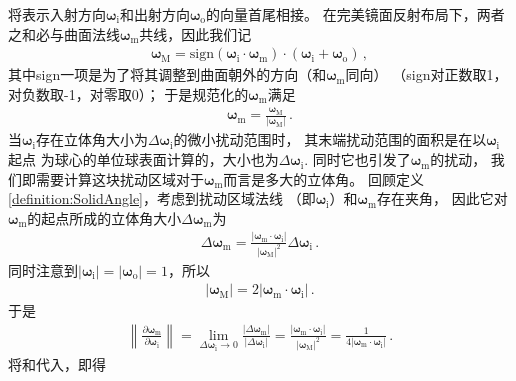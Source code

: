 将表示入射方向${\bm\omega}_{\mathrm{i}}$和出射方向${\bm\omega}_{\mathrm{o}}$的向量首尾相接。
在完美镜面反射布局下，两者之和必与曲面法线${\bm\omega}_{\mathrm{m}}$共线，因此我们记
\begin{align}
    {\bm\omega}_{\mathrm{M}}=\mathrm{sign}({\bm\omega}_{\mathrm{i}}\cdot{\bm\omega}_{\mathrm{m}})
    \cdot({\bm\omega}_{\mathrm{i}}+{\bm\omega}_{\mathrm{o}})\, ,
\end{align}
其中sign一项是为了将其调整到曲面朝外的方向（和${\bm\omega}_{\mathrm{m}}$同向）
（sign对正数取1，对负数取-1，对零取0）；
于是规范化的${\bm\omega}_{\mathrm{m}}$满足
\begin{align}
    {\bm\omega}_{\mathrm{m}}=\frac{{\bm\omega}_{\mathrm{M}}}{|{\bm\omega}_{\mathrm{M}}|}\, .
\end{align}
当${\bm\omega}_{\mathrm{i}}$存在立体角大小为$\Delta{\bm\omega}_{\mathrm{i}}$的微小扰动范围时，
其末端扰动范围的面积是在以${\bm\omega}_{\mathrm{i}}$起点
为球心的单位球表面计算的，大小也为$\Delta{\bm\omega}_{\mathrm{i}}$.
同时它也引发了${\bm\omega}_{\mathrm{m}}$的扰动，
我们即需要计算这块扰动区域对于${\bm\omega}_{\mathrm{m}}$而言是多大的立体角。
回顾定义\ref{definition:SolidAngle}，考虑到扰动区域法线
（即${\bm\omega}_{\mathrm{i}}$）和${\bm\omega}_{\mathrm{m}}$存在夹角，
因此它对${\bm\omega}_{\mathrm{m}}$的起点所成的立体角大小$\Delta{\bm\omega}_{\mathrm{m}}$为
\begin{align}
    \Delta{\bm\omega}_{\mathrm{m}}=\frac{|{\bm\omega}_{\mathrm{m}}\cdot{\bm\omega}_{\mathrm{i}}|}
    {|{\bm\omega}_{\mathrm{M}}|^2}\Delta{\bm\omega}_{\mathrm{i}}\, .
\end{align}
同时注意到$|{\bm\omega}_{\mathrm{i}}|=|{\bm\omega}_{\mathrm{o}}|=1$，所以
\begin{align}\label{eq:08ex01-SimpleSymmetry}
    |{\bm\omega}_{\mathrm{M}}|=2|{\bm\omega}_{\mathrm{m}}\cdot{\bm\omega}_{\mathrm{i}}|\, .
\end{align}
于是
\begin{align}\label{eq:08ex01-JacobianRefraction}
    \left\lVert\frac{\partial{\bm\omega}_{\mathrm{m}}}{\partial{\bm\omega}_{\mathrm{i}}}\right\rVert
    =\lim\limits_{\Delta{\bm\omega}_{\mathrm{i}}\to0}\frac{|\Delta{\bm\omega}_{\mathrm{m}}|}{|\Delta{\bm\omega}_{\mathrm{i}}|}
    =\frac{|{\bm\omega}_{\mathrm{m}}\cdot{\bm\omega}_{\mathrm{i}}|}{|{\bm\omega}_{\mathrm{M}}|^2}
    =\frac{1}{4|{\bm\omega}_{\mathrm{m}}\cdot{\bm\omega}_{\mathrm{i}}|}\, .
\end{align}
将和代入，即得
